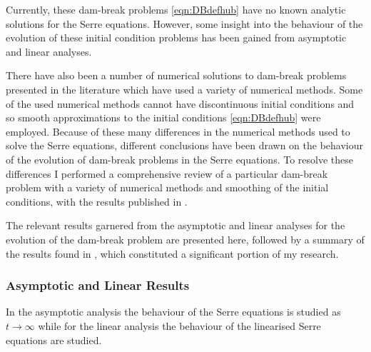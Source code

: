 Currently, these dam-break problems \eqref{eqn:DBdefhub} have no known analytic solutions for the Serre equations. However, some insight into the behaviour of the evolution of these initial condition problems has been gained from asymptotic \cite{El-etal-2006} and linear \cite{Dougalis-etal-2007} analyses. 

There have also been a number of numerical solutions to dam-break problems presented in the literature \cite{El-etal-2006,Hank-etal-2010-2034,Mitsotakis-etal-2014,Mitsotakis-etal-2017,doCarmo-etal-2018-404} which have used a variety of numerical methods.  Some of the used numerical methods cannot have discontinuous initial conditions \cite{El-etal-2006,Mitsotakis-etal-2014,Mitsotakis-etal-2017,doCarmo-etal-2018-404} and so smooth approximations to the initial conditions \eqref{eqn:DBdefhub} were employed. Because of these many differences in the numerical methods used to solve the Serre equations, different conclusions have been drawn on the behaviour of the evolution of dam-break problems in the Serre equations. To resolve these differences I performed a comprehensive review of a particular dam-break problem with a variety of numerical methods and smoothing of the initial conditions, with the results published in \cite{Pitt-2018-61}. 

The relevant results garnered from the asymptotic \cite{El-etal-2006} and linear \cite{Dougalis-etal-2007} analyses for the evolution of the dam-break problem are presented here, followed by a summary of the results found in \cite{Pitt-2018-61}, which constituted a significant portion of my research. 

\subsubsection{Asymptotic and Linear Results}
In the asymptotic analysis the behaviour of the Serre equations is studied as $t \rightarrow \infty$ while for the linear analysis the behaviour of the linearised Serre equations are studied. 

